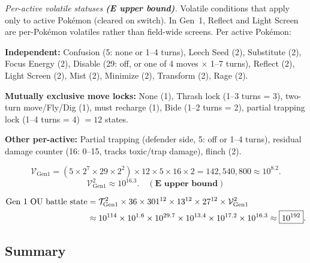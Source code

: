 \emph{Per-active volatile statuses \textbf{(E upper bound)}.}
Volatile conditions that apply only to active Pok\'emon (cleared on switch).
In Gen~1, Reflect and Light Screen are per-Pok\'emon volatiles rather than field-wide screens.
Per active Pok\'emon:

\textbf{Independent:}
Confusion (5: none or 1--4 turns),
Leech Seed (2),
Substitute (2),
Focus Energy (2),
Disable (29: off, or one of 4 moves $\times$ 1--7 turns),
Reflect (2),
Light Screen (2),
Mist (2),
Minimize (2),
Transform (2),
Rage (2).

\textbf{Mutually exclusive move locks:}
None (1), Thrash lock (1--3 turns = 3), two-turn move/Fly/Dig (1), must recharge (1), Bide (1--2 turns = 2), partial trapping lock (1--4 turns = 4) $= 12$ states.

\textbf{Other per-active:}
Partial trapping (defender side, 5: off or 1--4 turns),
residual damage counter (16: 0--15, tracks toxic/trap damage),
flinch (2).

\begin{equation}
    \mathcal{V}_{\text{Gen1}} = (5 \times 2^7 \times 29 \times 2^2) \times 12 \times 5 \times 16 \times 2 = 142{,}540{,}800 \approx 10^{8.2}.
\end{equation}
\begin{equation}
    \mathcal{V}_{\text{Gen1}}^{2} \approx 10^{16.3}. \quad \mathbf{(E\text{ upper bound})}
\end{equation}

\begin{align}
    \text{Gen 1 OU battle state}
    &= \mathcal{T}_{\text{Gen1}}^2
       \times 36
       \times 301^{12}
       \times 13^{12}
       \times 27^{12}
       \times \mathcal{V}_{\text{Gen1}}^{2} \notag \\
    &\approx 10^{114}
       \times 10^{1.6}
       \times 10^{29.7}
       \times 10^{13.4}
       \times 10^{17.2}
       \times 10^{16.3}
    \approx \boxed{10^{192}}.
    \label{eq:gen1-battle}
\end{align}

\subsection{Summary}

